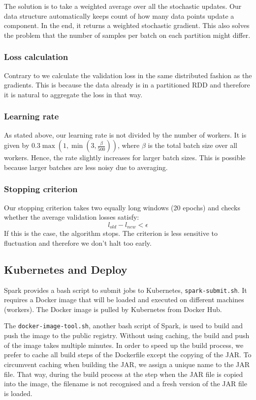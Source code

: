 \documentclass[a4paper, 11pt, conference]{ieeeconf}
\begin{document}
The solution is to take a weighted average over all the stochastic updates. Our data structure automatically keeps count of how many data points update a component. In the end, it returns a weighted stochastic gradient. This also solves the problem that the number of samples per batch on each partition might differ.

\subsubsection{Loss calculation}
Contrary to \cite{hogwild-python} we calculate the validation loss in the same distributed fashion as the gradients. This is because the data already is in a partitioned RDD and therefore it is natural to aggregate the loss in that way. 

\subsubsection{Learning rate}
As stated above, our learning rate is not divided by the number of workers. It is given by $0.3 \max(1, \min(3, \frac{\beta}{500}))$, where $\beta$ is the total batch size over all workers. Hence, the rate slightly increases for larger batch sizes. This is possible because larger batches are less noisy due to averaging.


\subsubsection{Stopping criterion}

Our stopping criterion takes two equally long windows (20 epochs) and checks whether the average validation losses satisfy:
$$
l_{old} - l_{new} < \epsilon 
$$
If this is the case, the algorithm stops. The criterion is less sensitive to fluctuation and therefore we don't halt too early.

\subsection{Kubernetes and Deploy}

Spark provides a bash script to submit jobs to Kubernetes, \texttt{spark-submit.sh}. It requires a Docker image that will be loaded and executed on different machines (workers). The Docker image is pulled by Kubernetes from Docker Hub. 

The \texttt{docker-image-tool.sh}, another bash script of Spark, is used to build and push the image to the public registry. Without using caching, the build and push of the image takes multiple minutes. In order to speed up the build process, we prefer to cache all build steps of the Dockerfile except the copying of the JAR. To circumvent caching when building the JAR, we assign a unique name to the JAR file. That way, during the build process at the step when the JAR file is copied into the image, the filename is not recognised and a fresh version of the JAR file is loaded.
\end{document}

